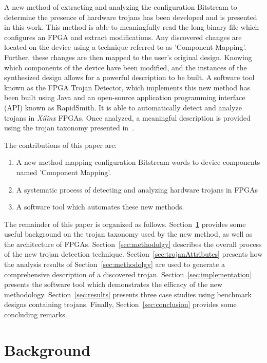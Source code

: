 \documentclass[journal, hidelinks]{IEEEtran}
\begin{document}
A new method of extracting and analyzing the configuration Bitstream to determine the presence of hardware trojans has been developed and is presented in this work.
This method is able to meaningfully read the long binary file which configures an FPGA and extract modifications.
Any discovered changes are located on the device using a technique referred to as 'Component Mapping'.
Further, these changes are then mapped to the user's original design.
Knowing which components of the device have been modified, and the instances of the synthesized design allows for a powerful description to be built.
A software tool known as the FPGA Trojan Detector, which implements this new method has been built using Java and an open-source application programming interface (API) known as RapidSmith. 
It is able to automatically detect and analyze trojans in \textit{Xilinx} FPGAs.
Once analyzed, a meaningful description is provided using the trojan taxonomy presented in~\cite{samerAttribute}.

The contributions of this paper are:
\begin{enumerate}
	\item A new method mapping configuration Bitstream words to device components named 'Component Mapping'.
	\item A systematic process of detecting and analyzing hardware trojans in FPGAs
	\item A software tool which automates these new methods.
\end{enumerate}

The remainder of this paper is organized as follows.
Section~\ref{sec:background} provides some useful background on the trojan taxonomy used by the new method, as well as the architecture of FPGAs.
Section~\ref{sec:methodolgy} describes the overall process of the new trojan detection technique.
Section~\ref{sec:trojanAttributes} presents how the analysis results of Section~\ref{sec:methodolgy} are used to generate a comprehensive description of a discovered trojan.
Section~\ref{sec:implementation} presents the software tool which demonstrates the efficacy of the new methodology.
Section~\ref{sec:results} presents three case studies using benchmark designs containing trojans.
Finally, Section~\ref{sec:conclusion} provides some concluding remarks.

\section{Background} \label{sec:background}
\end{document}
